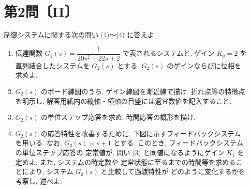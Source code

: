 
\section*{第2問〔II〕}

制御システムに関する次の問い (1)〜(4) に答えよ.

\begin{enumerate}[label=(\arabic*)]
  \item 伝達関数 $G_1(s)=\dfrac{1}{20s^{2}+22s+2}$ で表されるシステムと, ゲイン $K_0=2$ を
        直列結合したシステムを $G_2(s)$ とする. $G_2(s)$ のゲインならびに位相を求めよ.

  \item $G_2(s)$ のボード線図のうち, ゲイン線図を漸近線で描け. 折れ点等の特徴点を明示し,
        解答用紙内の縦軸・横軸の目盛には適宜数値を記入すること.

  \item $G_2(s)$ の単位ステップ応答を求め, 時間応答の概形を描け.

  \item $G_2(s)$ の応答特性を改善するために, 下図に示すフィードバックシステムを用いる.
        なお, $G_3(s)=s+1$ とする. このとき, フィードバックシステムの単位ステップ応答の
        定常値が, 問い (3) と同値になるようにゲイン $K_1$ を定めよ. また, システムの時定数や
        定常状態に至るまでの時間等を求めることにより, システム $G_2(s)$ と比較して過渡特性が
        どのように変化するかを考察し, 述べよ.

  \begin{center}
  \end{center}
\end{enumerate}
